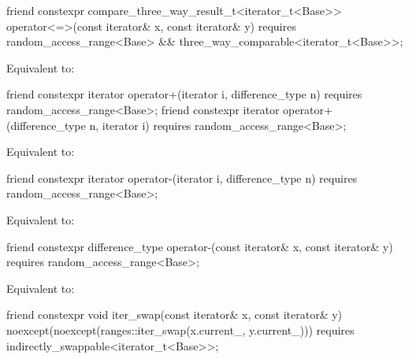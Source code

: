 %
\begin{itemdecl}
friend constexpr compare_three_way_result_t<iterator_t<Base>>
  operator<=>(const iterator& x, const iterator& y)
    requires random_access_range<Base> && three_way_comparable<iterator_t<Base>>;
\end{itemdecl}

\begin{itemdescr}
\pnum
\effects
Equivalent to: 
\end{itemdescr}

%
\begin{itemdecl}
friend constexpr iterator operator+(iterator i, difference_type n)
  requires random_access_range<Base>;
friend constexpr iterator operator+(difference_type n, iterator i)
  requires random_access_range<Base>;
\end{itemdecl}

\begin{itemdescr}
\pnum
\effects
Equivalent to: 
\end{itemdescr}

%
\begin{itemdecl}
friend constexpr iterator operator-(iterator i, difference_type n)
  requires random_access_range<Base>;
\end{itemdecl}

\begin{itemdescr}
\pnum
\effects
Equivalent to: 
\end{itemdescr}

%
\begin{itemdecl}
friend constexpr difference_type operator-(const iterator& x, const iterator& y)
  requires random_access_range<Base>;
\end{itemdecl}

\begin{itemdescr}
\pnum
\effects
Equivalent to: 
\end{itemdescr}

%
\begin{itemdecl}
friend constexpr void iter_swap(const iterator& x, const iterator& y)
  noexcept(noexcept(ranges::iter_swap(x.current_, y.current_)))
  requires indirectly_swappable<iterator_t<Base>>;
\end{itemdecl}

